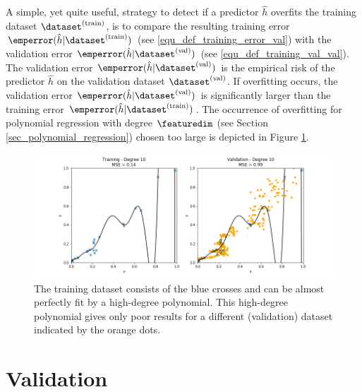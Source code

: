 \documentclass[12pt]{report}
\begin{document}
A simple, yet quite useful, strategy to detect if a predictor $\hat{h}$ overfits the training 
dataset $\dataset^{(\rm train)}$, is to compare the resulting training error 
$\emperror(\hat{h}| \dataset^{(\rm train)})$ (see \eqref{equ_def_training_error_val}) with the 
validation error $\emperror(\hat{h}| \dataset^{(\rm val)})$ (see \eqref{equ_def_training_val_val}). 
The validation error $\emperror(\hat{h}| \dataset^{(\rm val)})$ is the empirical risk of the predictor 
$\hat{h}$ on the validation dataset $\dataset^{(\rm val)}$. If overfitting occurs, the validation 
error $\emperror(\hat{h}| \dataset^{(\rm val)})$ is significantly larger than the training error 
$\emperror(\hat{h}| \dataset^{(\rm train)})$. The occurrence of overfitting for polynomial regression with 
degree $\featuredim$ (see Section \ref{sec_polynomial_regression}) chosen too large is depicted in 
Figure \ref{fig_polyn_training}. 

\begin{figure}[htbp]
	\centering
	\includegraphics[width=\textwidth]{OverfittedPolyn.png}  
	\caption{The training dataset consists of the blue crosses and can be almost perfectly 
		fit by a high-degree polynomial. This high-degree polynomial gives only poor results 
		for a different (validation) dataset indicated by the orange dots.}
	\label{fig_polyn_training}
\end{figure}


\section{Validation}
\label{sec_validate_predictor}
\end{document}
